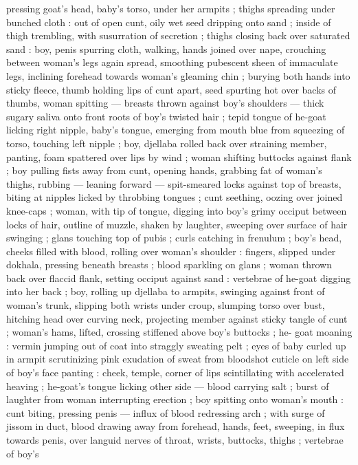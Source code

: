 pressing goat's head, baby's torso, under her armpits ; thighs
spreading under bunched cloth : out of open cunt, oily wet seed
dripping onto sand ; inside of thigh trembling, with susurration of
secretion ; thighs closing back over saturated sand : boy, penis
spurring cloth, walking, hands joined over nape, crouching between
woman's legs again spread, smoothing pubescent sheen of
immaculate legs, inclining forehead towards woman's gleaming chin
; burying both hands into sticky fleece, thumb holding lips of cunt
apart, seed spurting hot over backs of thumbs, woman spitting ---
breasts thrown against boy's shoulders --- thick sugary saliva onto
front roots of boy's twisted hair ; tepid tongue of he-goat licking
right nipple, baby's tongue, emerging from mouth blue from
squeezing of torso, touching left nipple ; boy, djellaba rolled back
over straining member, panting, foam spattered over lips by wind ;
woman shifting buttocks against flank ; boy pulling fists away from
cunt, opening hands, grabbing fat of woman's thighs, rubbing ---
leaning forward --- spit-smeared locks against top of breasts, biting
at nipples licked by throbbing tongues ; cunt seething, oozing over
joined knee-caps ; woman, with tip of tongue, digging into boy's
grimy occiput between locks of hair, outline of muzzle, shaken by
laughter, sweeping over surface of hair swinging ; glans touching top
of pubis ; curls catching in frenulum ; boy's head, cheeks filled with
blood, rolling over woman's shoulder : fingers, slipped under
dokhala, pressing beneath breasts ; blood sparkling on glans ;
woman thrown back over flaccid flank, setting occiput against sand :
vertebrae of he-goat digging into her back ; boy, rolling up djellaba
to armpits, swinging against front of woman's trunk, slipping both
wrists under croup, slumping torso over bust, hitching head over
curving neck, projecting member against sticky tangle of cunt ;
woman's hams, lifted, crossing stiffened above boy's buttocks ; he-
goat moaning : vermin jumping out of coat into straggly sweating
pelt ; eyes of baby curled up in armpit scrutinizing pink exudation of
sweat from bloodshot cuticle on left side of boy's face panting :
cheek, temple, corner of lips scintillating with accelerated heaving ;
he-goat's tongue licking other side --- blood carrying salt ; burst of
laughter from woman interrupting erection ; boy spitting onto
woman's mouth : cunt biting, pressing penis --- influx of blood
redressing arch ; with surge of jissom in duct, blood drawing away
from forehead, hands, feet, sweeping, in flux towards penis, over
languid nerves of throat, wrists, buttocks, thighs ; vertebrae of boy's
